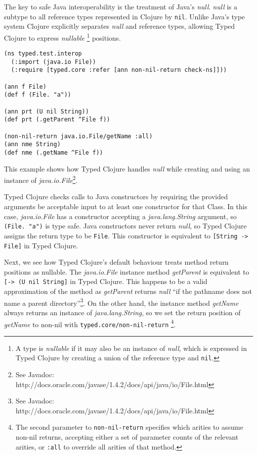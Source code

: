 The key to safe Java interoperability is the treatment of Java's \emph{null}.
\emph{null} is a subtype to all reference types
represented in Clojure by \lstinline|nil|. Unlike Java's type system
Clojure explicitly separates \emph{null} and reference types, allowing
Typed Clojure to express
\emph{nullable}
\footnote{A type is \emph{nullable} if it may also be an instance of \emph{null},
which is expressed in Typed Clojure by creating a union of the reference type and \lstinline|nil|.}
positions.

\begin{lstlisting}[caption=Java interoperability with Typed Clojure]
(ns typed.test.interop
  (:import (java.io File))
  (:require [typed.core :refer [ann non-nil-return check-ns]]))

(ann f File)
(def f (File. "a"))

(ann prt (U nil String))
(def prt (.getParent ^File f))

(non-nil-return java.io.File/getName :all)
(ann nme String)
(def nme (.getName ^File f))

\end{lstlisting}

This example shows how Typed Clojure handles \emph{null} while creating and
using an instance of \emph{java.io.File}\footnote{See Javadoc: http://docs.oracle.com/javase/1.4.2/docs/api/java/io/File.html}.

Typed Clojure checks calls to Java constructors by requiring the provided
arguments be acceptable input to at least one constructor for that Class.
In this case, \emph{java.io.File} has a constructor accepting a \emph{java.lang.String}
argument, so \lstinline|(File. "a")| is type safe. Java constructors never
return \emph{null}, so Typed Clojure assigns the return type to be \lstinline|File|.
This constructor is equivalent to \lstinline|[String -> File]| in Typed Clojure.

Next, we see how Typed Clojure's default behaviour treats method return positions as nullable.
The \emph{java.io.File} instance method \emph{getParent}
is equivalent to \lstinline|[-> (U nil String]| in Typed Clojure. This happens to be
a valid approximation of the method as \emph{getParent} returns \emph{null} 
``if the pathname does not name a parent directory''\footnote{See Javadoc: http://docs.oracle.com/javase/1.4.2/docs/api/java/io/File.html}.
On the other hand, the instance method \emph{getName} always returns an
instance of \emph{java.lang.String}, so we set the return position of
\emph{getName} to non-nil with \lstinline|typed.core/non-nil-return|
\footnote{The second parameter to \lstinline|non-nil-return| specifies which arities to assume non-nil 
returns, accepting either a set of parameter counts of the relevant arities, or \lstinline|:all|
to override all arities of that method.}.
